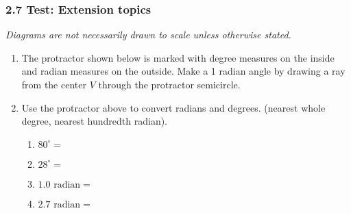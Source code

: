 

\fancyhead[LE]{\thepage}



\subsubsection*{2.7 Test: Extension topics}
\emph{Diagrams are not necessarily drawn to scale unless otherwise stated.}
\begin{enumerate}

\item The protractor shown below is marked with degree measures on the inside and radian measures on the outside. Make a 1 radian angle by drawing a ray from the center $V$ through the protractor semicircle. \par \medskip
  \begin{center}
  \end{center}

\item Use the protractor above to convert radians and degrees. (nearest whole degree, nearest hundredth radian).
  \begin{multicols}{2}
    \begin{enumerate}
      \item $80^\circ = $ \vspace{0.7cm}
      \item $28^\circ = $ \vspace{0.7cm}
      \item $\displaystyle 1.0 \text{ radian} =$ \vspace{0.7cm}
      \item $\displaystyle 2.7 \text{ radian} =$
    \end{enumerate}
  \end{multicols}


\end{enumerate}
